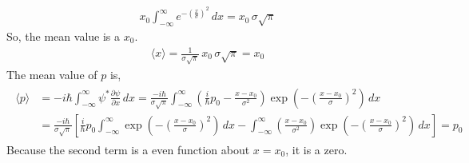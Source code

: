 \documentclass[floatfix,nofootinbib,superscriptaddress,fleqn]{revtex4}
\begin{document}
\begin{itemize}
\begin{align*}
    x_0\int_{-\infty}^{\infty} e^{-{\left(\frac{x}{\sigma}\right)}^2}\,dx 
    = x_0\,\sigma\sqrt{\pi}
  \end{align*}
So, the mean value is a $x_0$.
  \begin{align}
    \langle x \rangle=\frac{1}{\sigma\sqrt{\pi}}\,x_0\,\sigma\sqrt{\pi} = x_0
  \end{align}
The mean value of $p$ is,
  \begin{align}
    \begin{split}
      \langle p \rangle &= -i\hbar \int_{-\infty}^{\infty} 
      \psi^*\frac{\partial \psi}{\partial x}\,dx 
      =\frac{-i\hbar}{\sigma\sqrt{\pi}}
      \int_{-\infty}^{\infty}
      \left(\frac{i}{\hbar}p_0
      -\frac{x-x_0}{\sigma^2}\right)
      \exp\left(-{\left(\frac{x-x_0}{\sigma}\right)}^2 \right)\,dx \\
      &=\frac{-i\hbar}{\sigma\sqrt{\pi}}\left[\frac{i}{\hbar}p_0
      \int_{-\infty}^{\infty}
      \exp\left(-{\left(\frac{x-x_0}{\sigma}\right)}^2 \right)\,dx 
      -\int_{-\infty}^{\infty}
      \left(\frac{x-x_0}{\sigma^2}\right)
      \exp\left(-{\left(\frac{x-x_0}{\sigma}\right)}^2\right)\,dx\right] 
      = p_0    
    \end{split}
  \end{align}
Because the second term is a even function about $x=x_0$, it is a zero.


\end{itemize}
\end{document}
